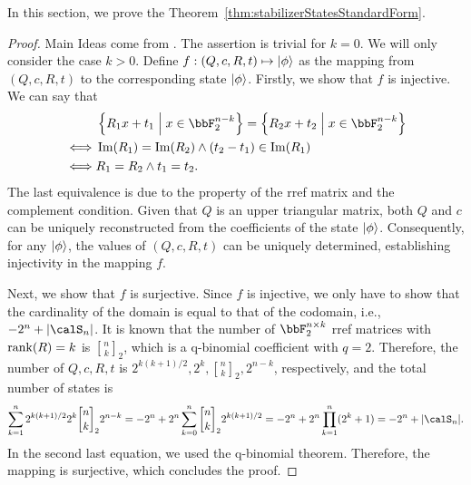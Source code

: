 \documentclass[a4paper, onecolumn, 11pt, longbibliography]{quantumarticle}
\newcommand{\Rank}[1]{\mathrm{rank}\qty(#1)}
\newcommand{\qBinom}[2]{\genfrac{[}{]}{0pt}{}{#1}{#2}}
\begin{document}
In this section, we prove the Theorem~\ref{thm:stabilizerStatesStandardForm}.
\stabilizerStatesStandardForm*
\begin{proof}
  Main Ideas come from \cite{struchalinExperimentalEstimationQuantum2021b}.
  The assertion is trivial for $k=0$.
  We will only consider the case $k>0$.
  Define $f: (Q,c,R,t) \mapsto \ket{\phi}$
  as the mapping from $(Q,c,R,t)$ to
  the corresponding state $\ket{\phi}$.
  Firstly, we show that $f$ is injective.
  We can say that
  \begin{align*}
         & \left\{R_1 x + t_1 \;\middle|\; x \in \bbF_2^{n-k} \right\} = \left\{R_2 x + t_2 \;\middle|\; x \in \bbF_2^{n-k} \right\} \\
    \iff & \Im(R_1)=\Im(R_2) \land (t_2-t_1) \in \Im(R_1)                                                                            \\
    \iff & R_1 = R_2 \land t_1 = t_2.
  \end{align*}
  The last equivalence is due to the
  property of the rref matrix and the complement condition.
  Given that $Q$ is an upper triangular matrix,
  both $Q$ and $c$ can be uniquely reconstructed from the coefficients of the state $\ket{\phi}$. Consequently, for any $\ket{\phi}$, the values of $(Q,c,R,t)$ can be uniquely determined, establishing injectivity in the mapping $f$.

  Next, we show that $f$ is surjective.
  Since $f$ is injective, we only have to show
  that the cardinality of the domain is equal to that of the codomain,
  i.e., $-2^n+\abs{\calS_n}$.
  It is known that the number of $\bbF_2^{n \times k}$ rref matrices
  with $\Rank{R}=k$ is $\qBinom{n}{k}_2$,
  which is a q-binomial coefficient with $q=2$.
  Therefore, the number of $Q,c,R,t$ is
  $2^{k(k+1)/2},2^k,\qBinom{n}{k}_2,2^{n-k}$, respectively,
  and the total number of states is
  \begin{equation*}
    \sum_{k=1}^{n} 2^{k(k+1)/2} 2^k \qBinom{n}{k}_2 2^{n-k} \\
    = -2^n + 2^n \sum_{k=0}^{n} \qBinom{n}{k}_2 2^{k(k+1)/2}               \\
    = -2^n + 2^n \prod_{k=1}^{n} (2^k+1)
    = -2^n + \abs{\calS_n}.
  \end{equation*}
  In the second last equation, we used the q-binomial theorem.
  Therefore, the mapping is surjective, which concludes the proof.
\end{proof}
\end{document}
